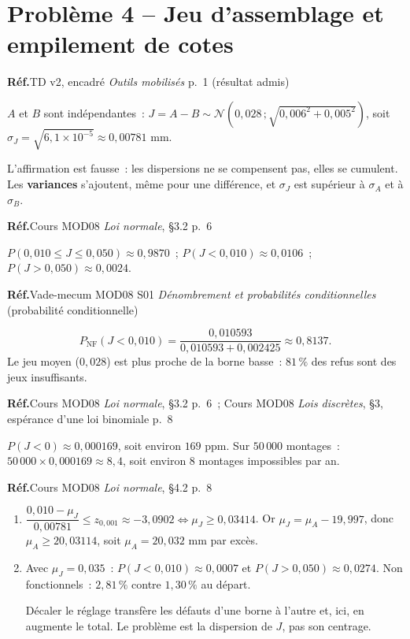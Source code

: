 \documentclass[a4paper,11pt]{article}
\newcommand{\source}[1]{{\footnotesize\color{uimmgray}\textbf{Réf.}\enspace #1}\par\smallskip}
\newcommand{\LN}{Cours MOD08 \textit{Loi normale}}
\newcommand{\LD}{Cours MOD08 \textit{Lois discrètes}}
\newcommand{\VM}{Vade-mecum MOD08 S01 \textit{Dénombrement et probabilités conditionnelles}}
\newcommand{\OM}{TD v2, encadré \textit{Outils mobilisés} p.~1}
\begin{document}
\section{Problème 4 -- Jeu d'assemblage et empilement de cotes}

\needspace{4cm}
\begin{correction}[-- Question 1]
\source{\OM{} (résultat admis)}
$A$ et $B$ sont indépendantes~: $J = A - B \sim \mathcal{N}\!\left(0{,}028\,;\sqrt{0{,}006^2 + 0{,}005^2}\right)$, soit $\sigma_J = \sqrt{6{,}1 \times 10^{-5}} \approx 0{,}00781$ mm.

L'affirmation est fausse~: les dispersions ne se compensent pas, elles se cumulent. Les \textbf{variances} s'ajoutent, même pour une différence, et $\sigma_J$ est supérieur à $\sigma_A$ et à $\sigma_B$.
\end{correction}

\needspace{4cm}
\begin{correction}[-- Question 2]
\source{\LN{}, §3.2 p.~6}
$P(0{,}010 \leq J \leq 0{,}050) \approx 0{,}9870$~; $P(J < 0{,}010) \approx 0{,}0106$~; $P(J > 0{,}050) \approx 0{,}0024$.
\end{correction}

\needspace{4cm}
\begin{correction}[-- Question 3]
\source{\VM{} (probabilité conditionnelle)}
\[
P_{\text{NF}}(J < 0{,}010) = \frac{0{,}010593}{0{,}010593 + 0{,}002425} \approx 0{,}8137.
\]
Le jeu moyen ($0{,}028$) est plus proche de la borne basse~: $81\,\%$ des refus sont des jeux insuffisants.
\end{correction}

\needspace{4cm}
\begin{correction}[-- Question 4]
\source{\LN{}, §3.2 p.~6~; \LD{}, §3, espérance d'une loi binomiale p.~8}
$P(J < 0) \approx 0{,}000169$, soit environ $169$ ppm. Sur $50\,000$ montages~: $50\,000 \times 0{,}000169 \approx 8{,}4$, soit environ $8$ montages impossibles par an.
\end{correction}

\needspace{6cm}
\begin{correction}[-- Question 5]
\source{\LN{}, §4.2 p.~8}
\begin{enumerate}[label=\alph*), leftmargin=14pt, itemsep=2pt]
  \item $\dfrac{0{,}010 - \mu_J}{0{,}00781} \leq z_{0{,}001} \approx -3{,}0902 \iff \mu_J \geq 0{,}03414$. Or $\mu_J = \mu_A - 19{,}997$, donc $\mu_A \geq 20{,}03114$, soit $\mu_A = 20{,}032$ mm par excès.
  \item Avec $\mu_J = 0{,}035$~: $P(J < 0{,}010) \approx 0{,}0007$ et $P(J > 0{,}050) \approx 0{,}0274$. Non fonctionnels~: $2{,}81\,\%$ contre $1{,}30\,\%$ au départ.

  Décaler le réglage transfère les défauts d'une borne à l'autre et, ici, en augmente le total. Le problème est la dispersion de $J$, pas son centrage.
\end{enumerate}
\end{correction}
\end{document}
